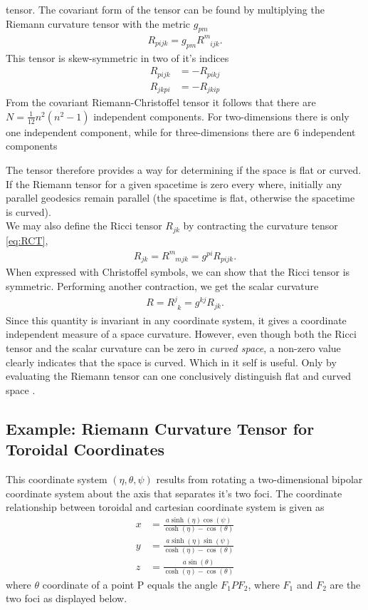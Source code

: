 \documentclass[main.tex]{subfiles}
\begin{document}
tensor. The covariant form of the tensor can be found by multiplying the Riemann curvature tensor with the 
metric $g_{pm}$
\begin{align*}
R_{pijk} = g_{pm}R^m_{\phantom{m}ijk}.
\end{align*}
This tensor is skew-symmetric in two of it's indices
\begin{align*}
R_{pijk} &= - R_{pikj}\\
R_{jkpi} &= - R_{jkip}
\end{align*}
From the covariant Riemann-Christoffel tensor it follows that there are  
$N = \frac{1}{12} n^2 (n^2 - 1)$ independent components. For two-dimensions
there is only one independent component, while for three-dimensions there are
6 independent components

The tensor therefore provides a way for determining if the space is flat or curved.
If the Riemann tensor for a given spacetime is zero every where, initially any parallel
geodesics remain parallel (the spacetime is flat, otherwise the spacetime is curved).
\\

We may also define the Ricci tensor $R_{jk}$ by contracting the curvature tensor \eqref{eq:RCT},
\begin{align*}
R_{jk} = R^m_{\phantom{m}mjk} = g^{pi}R_{pijk}.
\end{align*}
When expressed with Christoffel symbols, we can show that the Ricci tensor is symmetric.
Performing another contraction, we get the scalar curvature
\begin{align*}
R = R^{j}_{\phantom{j}k} = g^{kj}R_{jk}.
\end{align*}
Since this quantity is invariant in any coordinate system, it gives a coordinate
independent measure of a space curvature. However, even though both the Ricci tensor 
and the scalar curvature can be zero in \emph{curved space}, a non-zero value clearly 
indicates that the space is curved. Which in it self is useful. Only by evaluating
the Riemann tensor can one conclusively distinguish flat and curved space \cite{Moo10}.

\subsection{Example: Riemann Curvature Tensor for Toroidal Coordinates}

This coordinate system $(\eta, \theta , \psi)$ results from rotating a two-dimensional 
bipolar coordinate system about the axis that separates it's two foci. The coordinate 
relationship between toroidal and cartesian coordinate system is given as
\begin{align}
\label{eq:x_coord}
x &= \frac{a \sinh (\eta) \cos (\psi)}{\cosh (\eta) - \cos (\theta)} \\
\label{eq:y_coord}
y &= \frac{a \sinh (\eta) \sin (\psi)}{\cosh (\eta) - \cos (\theta)} \\
\label{eq:z_coord}
z &= \frac{a \sin (\theta)}{\cosh (\eta) - \cos (\theta)} 
\end{align}
where $\theta$ coordinate of a point P equals the angle $F_1 P F_2$, where $F_1$ and $F_2$
are the two foci as displayed below.
\end{document}
